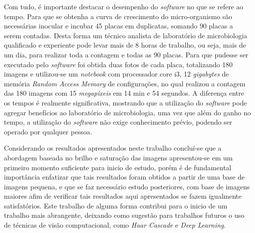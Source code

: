 Com tudo, é importante destacar o desempenho do \textit{software} no que se refere ao tempo. Para que se obtenha a curva de crescimento do micro-organismo são necessárias inocular e incubar 45 placas em duplicatas, somando 90 placas a serem contadas. Desta forma um técnico analista de laboratório de microbiologia qualificado e experiente pode levar mais de 8 horas de trabalho, ou seja, mais de um dia, para realizar toda a contagem e todas as 90 placas. Para que pudesse ser executado pelo \textit{software} foi obtida duas fotos de cada placa, totalizando 180 imagens e utilizou-se um \textit{notebook} com processador core i3, 12 \textit{gigabytes} de memória \textit{Random Access Memory}  de configurações, no qual realizou a contagem das 180 imagens com 15 \textit{megapixeis} em 14 min e 54 segundos. A diferença entre os tempos é realmente significativa, mostrando que a utilização do \textit{software} pode agregar benefícios ao laboratório de microbiologia, uma vez que além do ganho no tempo, a utilização do \textit{software} não exige conhecimento prévio, podendo ser operado por qualquer pessoa.

Considerando os resultados apresentados neste trabalho concluí-se que a abordagem baseada no brilho e saturação das imagens apresentou-se em um primeiro momento suficiente para inicio de estudo, porém é de fundamental importância enfatizar que tais resultados foram obtidos a partir de uma base de imagens pequena, e que se faz necessário estudo posteriores, com base de imagens maiores afim de verificar tais resultados aqui apresentados se fazem igualmente satisfatórios. Este trabalho de alguma forma contribui para o inicio de um trabalho mais abrangente, deixando como sugestão para trabalhos futuros o uso de técnicas de visão computacional, como \textit{Haar Cascade} e \textit{Deep Learning}.
